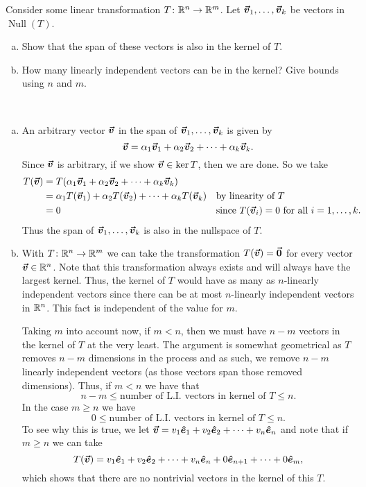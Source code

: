 \documentclass[12pt]{article} %
\newcommand{\ehat}{\boldsymbol{\hat{e}}}
\begin{document}
\newpage
\begin{problem}
Consider some linear transformation $T\colon \mathbb{R}^n \to \mathbb{R}^m$.  Let $\boldsymbol{\vec{v}}_1, \dots, \boldsymbol{\vec{v}}_k$ be vectors in $\operatorname{Null}(T)$.
\begin{enumerate}[(a)]
    \item Show that the span of these vectors is also in the kernel of $T$.
    \item How many linearly independent vectors can be in the kernel? Give bounds using $n$ and $m$.
\end{enumerate}
\end{problem}
\begin{solution} ~
\begin{enumerate}[(a)]
    \item An arbitrary vector $\boldsymbol{\vec{v}}$ in the span of $\boldsymbol{\vec{v}}_1,\dots,\boldsymbol{\vec{v}}_k$ is given by
    \[
    \boldsymbol{\vec{v}}= \alpha_1 \boldsymbol{\vec{v}}_1 + \alpha_2 \boldsymbol{\vec{v}}_2 + \cdots + \alpha_k \boldsymbol{\vec{v}}_k.
    \]
    Since $\boldsymbol{\vec{v}}$ is arbitrary, if we show $\boldsymbol{\vec{v}} \in \ker T$, then we are done.  So we take
    \begin{align*}
        T(\boldsymbol{\vec{v}}) &= T(\alpha_1 \boldsymbol{\vec{v}}_1 + \alpha_2 \boldsymbol{\vec{v}}_2 + \cdots + \alpha_k \boldsymbol{\vec{v}}_k )\\
        &= \alpha_1 T(\boldsymbol{\vec{v}}_1) + \alpha_2 T(\boldsymbol{\vec{v}}_2) + \cdots + \alpha_k T(\boldsymbol{\vec{v}}_k) && \textrm{by linearity of $T$}\\
        &= 0 &&\textrm{since $T(\boldsymbol{\vec{v}}_i)=0$ for all $i=1,\dots, k$.}
    \end{align*}
    Thus the span of $\boldsymbol{\vec{v}}_1,\dots,\boldsymbol{\vec{v}}_k$ is also in the nullspace of $T$.
    \item With $T\colon \mathbb{R}^n \to \mathbb{R}^m$ we can take the transformation $T(\boldsymbol{\vec{v}})=\boldsymbol{\vec{0}}$ for every vector $\boldsymbol{\vec{v}} \in \mathbb{R}^n$.  Note that this transformation always exists and will always have the largest kernel.  Thus, the kernel of $T$ would have as many as $n$-linearly independent vectors since there can be at most $n$-linearly independent vectors in $\mathbb{R}^n$. This fact is independent of the value for $m$.

    Taking $m$ into account now, if $m<n$, then we must have $n-m$ vectors in the kernel of $T$ at the very least. The argument is somewhat geometrical as $T$ removes $n-m$ dimensions in the process and as such, we remove $n-m$ linearly independent vectors (as those vectors span those removed dimensions).  Thus, if $m<n$ we have that
    \[
        n-m \leq \textrm{number of L.I. vectors in kernel of $T$} \leq n.
    \]
    In the case $m\geq n$ we have
    \[
       0 \leq \textrm{number of L.I. vectors in kernel of $T$} \leq n.
    \]
    To see why this is true, we let $\vecv = v_1 \ehat_1 + v_2 \ehat_2 + \cdots + v_n \ehat_n$ and note that if $m\geq n$ we can take
    \[
    T(\vecv) = v_1 \ehat_1 + v_2 \ehat_2 + \cdots + v_n \ehat_n + 0 \ehat_{n+1} +\cdots + 0 \ehat_{m},
    \]
    which shows that there are no nontrivial vectors in the kernel of this $T$.

\end{enumerate}

\end{solution}
\end{document}
